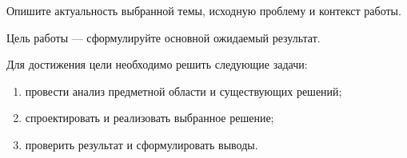 \intro

Опишите актуальность выбранной темы, исходную проблему и контекст работы.

Цель работы --- сформулируйте основной ожидаемый результат.

Для достижения цели необходимо решить следующие задачи:
\begin{enumerate}[label=--]
  \item провести анализ предметной области и существующих решений;
  \item спроектировать и реализовать выбранное решение;
  \item проверить результат и сформулировать выводы.
\end{enumerate}
